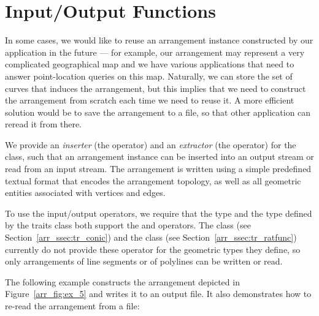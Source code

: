 \section{Input/Output Functions\label{arr_sec:io}}

In some cases, we would like to reuse an arrangement instance constructed
by our application in the future --- for example, our arrangement may
represent a very complicated geographical map and we have various
applications that need to answer point-location queries on this map.
Naturally, we can store the set of curves that induces the arrangement,
but this implies that we need to construct the arrangement from
scratch each time we need to reuse it. A more efficient solution would
be to save the arrangement to a file, so that other application can
reread it from there.

We provide an {\em inserter} (the \ccc{<<} operator) and an {\em extractor}
(the \ccc{>>} operator) for the  class,
such that an arrangement instance can be inserted into an output stream
or read from an input stream. The arrangement is written using a simple
predefined textual format that encodes the arrangement topology, as
well as all geometric entities associated with vertices and edges.

To use the input/output operators, we require that the  type
and the  type defined by the traits class both
support the \ccc{<<} and \ccc{>>} operators. The 
class (see Section~\ref{arr_ssec:tr_conic}) and the 
 class (see Section~\ref{arr_ssec:tr_ratfunc})
currently do not provide these operator for the geometric types
they define, so only arrangements of line segments or of polylines can
be written or read.

The following example constructs the arrangement depicted in 
Figure~\ref{arr_fig:ex_5} and writes it to an output file. It also
demonstrates how to re-read the arrangement from a file:


